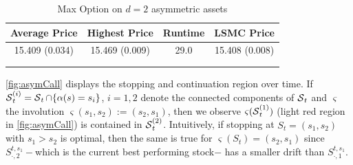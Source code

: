 \begin{table}[H]
\caption{Max Option on $d=2$ asymmetric assets}

\vspace{-2mm}
\label{tab:asymMaxOpt}
  \centering
  \begin{tabular}{ c c c c }
 \hline  \hline
    Average Price& Highest Price & Runtime & LSMC Price\\
  \hline \hline
 15.409 (0.034)  & 15.469 (0.009) & 29.0 & 15.408 (0.008) \\
 \hline\\[-1em]
 
 \multicolumn{3}{l}{%
  \begin{minipage}{7.5cm}%
  \end{minipage}%
}
\end{tabular}
  \end{table}
  
\cref{fig:asymCall} displays the stopping and continuation
region over time. 
If  $\operatorname{\mathcal{S}}^{(i)}_t = \operatorname{\mathcal{S}}_t \cap \{\alpha(s) = s_i\}$, $i=1,2$ denote the connected components of $\operatorname{\mathcal{S}}_t$ and $\varsigma$ the involution   $\varsigma(s_1,s_2) := (s_2,s_1)$, then we observe $\varsigma(\operatorname{\mathcal{S}}^{(1)}_t)$ (light red region in \cref{fig:asymCall}) is contained in $\operatorname{\mathcal{S}}^{(2)}_t$. Intuitively, if stopping at $S_t = (s_1,s_2)$ with $s_1 > s_2$ is optimal, then the same is true for   $\varsigma(S_t)=(s_2,s_1)$ since $S^{t,s_1}_{\cdot,2}-$which is the current best performing stock$-$ has a smaller drift than $S^{t,s_1}_{\cdot,1}$. 


  
  



